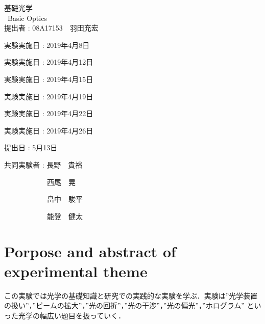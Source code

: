 \documentclass[11pt, a4paper]{jsarticle}
\begin{document}
\begin{titlepage}
  \begin{center}
    {\Huge 基礎光学 \\ Basic Optics}\\ %
    \vspace{30truept}
    {\huge 提出者 : 08A17153　羽田充宏}\\ %
    \vspace{50truept}

    \begin{list}{}{\setlength{\leftmargin}{80pt}}
    \item {\huge 実験実施日 : 2019年4月8日}\\
    \vspace{10truept}
    \item {\huge 実験実施日 : 2019年4月12日}\\
    \vspace{10truept}
    \item {\huge 実験実施日 : 2019年4月15日}\\
    \vspace{10truept}
    \item {\huge 実験実施日 : 2019年4月19日}\\
    \vspace{10truept}
    \item {\huge 実験実施日 : 2019年4月22日}\\
    \vspace{10truept}
    \item {\huge 実験実施日 : 2019年4月26日}\\
    \end{list}

    \vspace{50truept}
    {\huge 提出日 : 5月13日}\\ %
    \vspace{30truept}
    \begin{list}{}{\setlength{\leftmargin}{70pt}}
    \item {\huge 共同実験者 : 長野　貴裕}
    \item {\huge　　　　　　西尾　晃}
    \item {\huge　　　　　　畠中　駿平}
    \item {\huge　　　　　　能登　健太}
    \end{list}
  \end{center}
\end{titlepage}
\section*{Porpose and abstract of experimental theme}
この実験では光学の基礎知識と研究での実践的な実験を学ぶ．実験は”光学装置の扱い”，”ビームの拡大”，”光の回折”，”光の干渉”，”光の偏光”，”ホログラム”
といった光学の幅広い題目を扱っていく．






\end{document}
